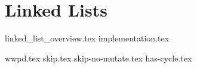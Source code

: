 \documentclass{exam}
\begin{document}
\newpage
\section{Linked Lists}
{linked_list_overview.tex}
{implementation.tex}
\begin{questions}
{wwpd.tex}
{skip.tex}
{skip-no-mutate.tex}
{has-cycle.tex}
\end{questions}
\end{document}
